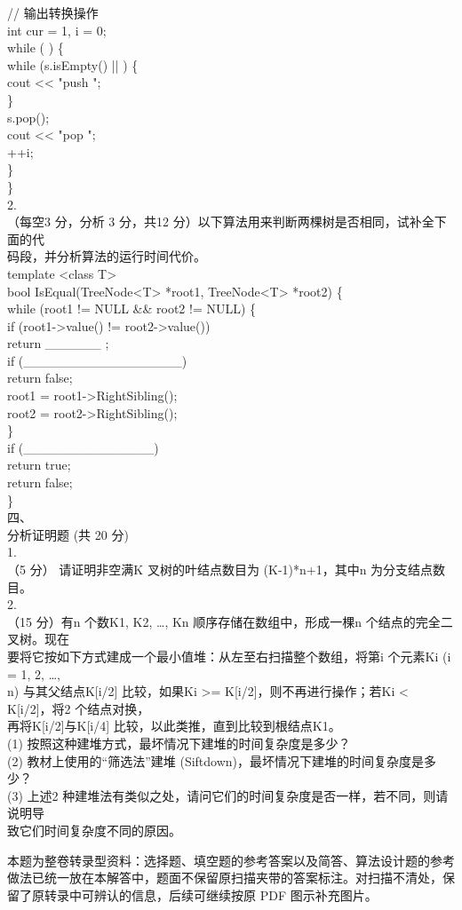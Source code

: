 \begin{question}
// 输出转换操作\\
int cur = 1,  i = 0;\\
while  (           ) \{\\
while (s.isEmpty()  ||            ) \{\\
cout << "push ";\\
\}\\
s.pop();\\
cout << "pop ";\\
++i;\\
\}\\
\}\\
2.\\
（每空3 分，分析 3 分，共12 分）以下算法用来判断两棵树是否相同，试补全下面的代\\
码段，并分析算法的运行时间代价。\\
template <class T>\\
bool IsEqual(TreeNode<T>  *root1,  TreeNode<T>  *root2) \{\\
while (root1 != NULL  \&\& root2 != NULL) \{\\
if (root1->value()  !=  root2->value())\\
return   \_\_\_\_\_\_ ;\\
if  (\_\_\_\_\_\_\_\_\_\_\_\_\_\_\_\_\_)\\
return false;\\
root1 = root1->RightSibling();\\
root2 = root2->RightSibling();\\
\}\\
if (\_\_\_\_\_\_\_\_\_\_\_\_\_\_)\\
return true;\\
return false;\\
\}\\
四、\\
分析证明题 (共 20 分)\\
1.\\
（5 分） 请证明非空满K 叉树的叶结点数目为 (K-1)*n+1，其中n 为分支结点数目。\\
2.\\
（15 分）有n 个数K1, K2, …, Kn 顺序存储在数组中，形成一棵n 个结点的完全二叉树。现在\\
要将它按如下方式建成一个最小值堆：从左至右扫描整个数组，将第i 个元素Ki (i = 1, 2, …,\\
n) 与其父结点K[i/2] 比较，如果Ki >= K[i/2]，则不再进行操作；若Ki < K[i/2]，将2 个结点对换，\\
再将K[i/2]与K[i/4] 比较，以此类推，直到比较到根结点K1。\\
(1) 按照这种建堆方式，最坏情况下建堆的时间复杂度是多少？\\
(2) 教材上使用的“筛选法”建堆 (Siftdown)，最坏情况下建堆的时间复杂度是多少？\\
(3) 上述2 种建堆法有类似之处，请问它们的时间复杂度是否一样，若不同，则请说明导\\
致它们时间复杂度不同的原因。\\
\begin{solution}
本题为整卷转录型资料：选择题、填空题的参考答案以及简答、算法设计题的参考做法已统一放在本解答中，题面不保留原扫描夹带的答案标注。对扫描不清处，保留了原转录中可辨认的信息，后续可继续按原 PDF 图示补充图片。


\end{solution}
\end{question}
